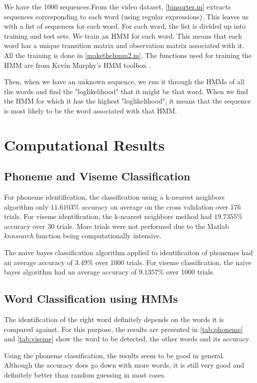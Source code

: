 \documentclass[a4paper]{article}
\begin{document}
We have the 1000 sequences.From the video dataset, \ref{binsorter.m} extracts sequences corresponding to each word (using regular expressions).
This leaves us with a list of sequences for each word. For each word, the list is divided up into training and test sets. We train an HMM for each word. This means that each word has a unique transition matrix and observation matrix associated with it. All the training is done in \ref{makethehmm2.m}. The functions used for training the HMM are from Kevin Murphy's HMM toolbox \cite{key-9}.

Then, when we have an unknown sequence, we run it through the HMMs of all the words and find the "loglikelihood" that it might be that word. When we find the HMM for which it has the highest "loglikelihood", it means that the sequence is most likely to be the word associated with that HMM.

\section{Computational Results}

\subsection{ Phoneme and Viseme Classification}
For phoneme identification, the classification using a k-nearest neighbors algorithm only $11.6103\%$ accuracy on average on the cross validation over 176 trials.  For viseme identification, the k-nearest neighbors method had $19.7355\%$ accuracy over 30 trials.  More trials were not performed due to the Matlab {\it knnsearch} function being computationally intensive.  

The naive bayes classification algorithm applied to identificaiton of phonemes had an average accuracy of $3.49\%$ over 1000 trials.  For viseme classification, the naive bayes algorithm had an average accuracy of $9.1357\%$ over 1000 trials. 

\subsection{Word Classification using HMMs}

The identification of the right word definitely depends on the words it is compared against. For this purpose, the results are presented in \ref{tab:phoneme} and \ref{tab:viseme} show the word to be detected, the other words and its accuracy.

Using the phoneme classification, the results seem to be good in general. Although the accuracy does go down with more words, it is still very good and definitely better than random guessing in most cases.
\end{document}
